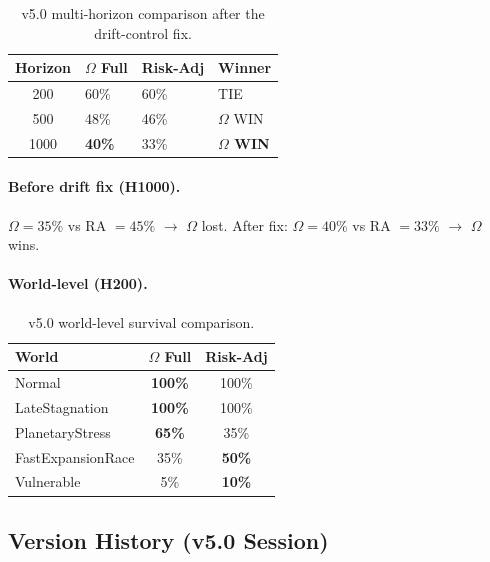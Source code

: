 \begin{table}[ht]
\centering
\small
\begin{tabularx}{\linewidth}{cXXX}
\toprule
\textbf{Horizon} & \textbf{$\Omega$ Full} & \textbf{Risk-Adj} &
\textbf{Winner} \\
\midrule
200 & 60\% & 60\% & TIE \\
500 & 48\% & 46\% & $\Omega$ WIN \\
1000 & \textbf{40\%} & 33\% & \textbf{$\Omega$ WIN} \\
\bottomrule
\end{tabularx}
\caption[v5.0 multi-horizon]{v5.0 multi-horizon comparison after the
drift-control fix.}
\label{tab:methodology-v50-horizon}
\end{table}

\paragraph{Before drift fix (H1000).}
$\Omega = 35\%$ vs RA $= 45\%$ $\to$ $\Omega$ lost. After fix:
$\Omega = 40\%$ vs RA $= 33\%$ $\to$ $\Omega$ wins.

\paragraph{World-level (H200).}

\begin{table}[ht]
\centering
\small
\begin{tabularx}{\linewidth}{Xcc}
\toprule
\textbf{World} & \textbf{$\Omega$ Full} & \textbf{Risk-Adj} \\
\midrule
Normal & \textbf{100\%} & 100\% \\
LateStagnation & \textbf{100\%} & 100\% \\
PlanetaryStress & \textbf{65\%} & 35\% \\
FastExpansionRace & 35\% & \textbf{50\%} \\
Vulnerable & 5\% & \textbf{10\%} \\
\bottomrule
\end{tabularx}
\caption[v5.0 world-level survival]{v5.0 world-level survival
comparison.}
\label{tab:methodology-v50-world}
\end{table}

\subsection{Version History (v5.0 Session)}
\label{sec:methodology-v50-history}

